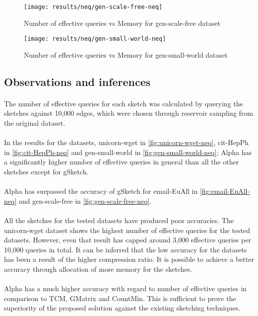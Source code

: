 \begin{figure}[H]
    \centering \texttt{[image: results/neq/gen-scale-free-neq]}
    \vspace{-0.5cm}
    \caption{Number of effective queries vs Memory for gen-scale-free dataset}
    \label{fig:gen-scale-free-neq}
\end{figure}

\begin{figure}[H]
    \centering \texttt{[image: results/neq/gen-small-world-neq]}
    \vspace{-0.5cm}
    \caption{Number of effective queries vs Memory for gen-small-world dataset}
    \label{fig:gen-small-world-neq}
\end{figure}

\subsection*{Observations and inferences}

\paragraph{}
The number of effective queries for each sketch was calculated by querying the sketches against 10,000 edges, which were chosen through reservoir sampling from the original dataset. 

\paragraph{}
In the results for the datasets, unicorn-wget in \autoref{fig:unicorn-wget-neq}, cit-HepPh in \autoref{fig:cit-HepPh-neq} and gen-small-world in \autoref{fig:gen-small-world-neq}; Alpha has a significantly higher number of effective queries in general than all the other sketches except for gSketch.

\paragraph{}
Alpha has surpassed the accuracy of gSketch for email-EuAll in \autoref{fig:email-EuAll-neq} and gen-scale-free in \autoref{fig:gen-scale-free-neq}. 

\paragraph{}
All the sketches for the tested datasets have produced poor accuracies. The unicorn-wget dataset shows the highest number of effective queries for the tested datasets. However, even that result has capped around 3,000 effective queries per 10,000 queries in total. It can be inferred that the low accuracy for the datasets has been a result of the higher compression ratio. It is possible to achieve a better accuracy through allocation of more memory for the sketches. 

\paragraph{}
Alpha has a much higher accuracy with regard to number of effective queries in comparison to TCM, GMatrix and CountMin. This is sufficient to prove the superiority of the proposed solution against the existing sketching techniques. 